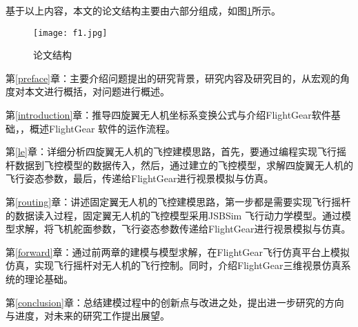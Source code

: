 基于以上内容，本文的论文结构主要由六部分组成，如图\ref{fig1}所示。
\vspace{10pt}
\begin{figure}[!ht]
\centering
\texttt{[image: f1.jpg]}
\caption{论文结构 }
\label{fig1}
\end{figure}


第\ref{preface}章：主要介绍问题提出的研究背景，研究内容及研究目的，从宏观的角度对本文进行概括，对问题进行概述。

第\ref{introduction}章：推导四旋翼无人机坐标系变换公式与介绍FlightGear软件基础，，概述FlightGear 软件的运作流程。

第\ref{le}章：详细分析四旋翼无人机的飞控建模思路，首先，要通过编程实现飞行摇杆数据到飞控模型的数据传入，然后，通过建立的飞控模型，求解四旋翼无人机的飞行姿态参数，最后，传递给FlightGear进行视景模拟与仿真。

第\ref{routing}章：讲述固定翼无人机的飞控建模思路，第一步都是需要实现飞行摇杆的数据读入过程，固定翼无人机的飞控模型采用JSBSim 飞行动力学模型。通过模型求解，将飞机舵面参数，飞行姿态参数传递给FlightGear进行视景模拟与仿真。

第\ref{forward}章：通过前两章的建模与模型求解，在FlightGear飞行仿真平台上模拟仿真，实现飞行摇杆对无人机的飞行控制。同时，介绍FlightGear三维视景仿真系统的理论基础。

第\ref{conclusion}章：总结建模过程中的创新点与改进之处，提出进一步研究的方向与进度，对未来的研究工作提出展望。

